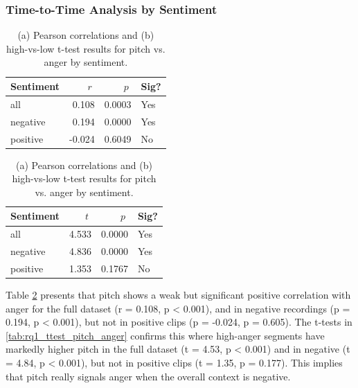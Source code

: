   \subsubsection{Time-to-Time Analysis by Sentiment}
  \begin{table}[H]
    \centering
    \begin{subtable}{0.45\textwidth}
      \centering
      \caption{Pitch and Anger (Pearson \(r\))}\label{tab:rq1_corr_pitch_anger}
      \begin{tabular}{l r r l}
        \toprule
        Sentiment & \(\;r\;\) & \(\;p\;\) & Sig? \\
        \midrule
        all      &  0.108 & 0.0003 & Yes \\
        negative &  0.194 & 0.0000 & Yes \\
        positive & -0.024 & 0.6049 & No  \\
        \bottomrule
      \end{tabular}
    \end{subtable}\hfill
    \begin{subtable}{0.45\textwidth}
      \centering
      \caption{Pitch and Anger (t-test)}\label{tab:rq1_ttest_pitch_anger}
      \begin{tabular}{l r r l}
        \toprule
        Sentiment & \(\;t\;\) & \(\;p\;\) & Sig? \\
        \midrule
        all      &  4.533 & 0.0000 & Yes \\
        negative &  4.836 & 0.0000 & Yes \\
        positive &  1.353 & 0.1767 & No  \\
        \bottomrule
      \end{tabular}
    \end{subtable}
    \caption{(a) Pearson correlations and (b) high-vs-low t-test results for pitch vs. anger by sentiment.}
    \label{tab:rq1_pitch_anger_side_by_side}
  \end{table}
  
  Table \ref{tab:rq1_pitch_anger_side_by_side} presents that pitch shows a weak but significant positive correlation with anger for the full dataset (r = 0.108, p < 0.001), and in negative recordings (p = 0.194, p < 0.001), but not in positive clips (p = -0.024, p = 0.605). 
  The t-tests in \ref{tab:rq1_ttest_pitch_anger} confirms this where high-anger segments have markedly higher pitch in the full dataset (t = 4.53, p < 0.001) and in negative (t = 4.84, p < 0.001), but not in positive clips (t = 1.35, p = 0.177).
  This implies that pitch really signals anger when the overall context is negative. 

